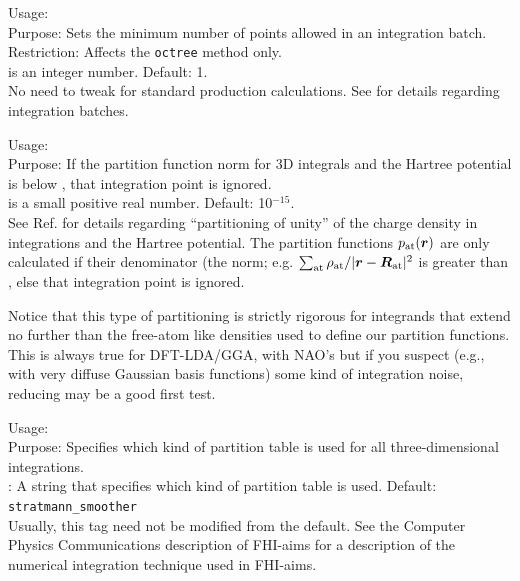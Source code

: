 {
  \noindent
  Usage:   \\[1.0ex]
  Purpose: Sets the minimum number of points allowed in an integration
  batch. \\[1.0ex]
  Restriction: Affects the \texttt{octree}
   method only. \\[1.0ex] 
   is an integer number. Default: 1. \\
}
No need to tweak for standard production calculations. See
 for details regarding integration
batches. 

{
  \noindent
  Usage:   \\[1.0ex]
  Purpose: If the partition function norm for 3D integrals and the
  Hartree potential is below , that integration
  point is ignored. \\[1.0ex]
   is a small positive real number. Default:
    10$^{-15}$. \\
}
See Ref. \cite{Blum08} for details regarding ``partitioning of unity''
of the charge density in integrations and the Hartree potential. 
The partition functions $p_\text{at}(\mbox{\boldmath$r$})$ are only
calculated if their denominator (the norm; e.g. $\sum_\text{at}
\rho_\text{at}/|\mbox{\boldmath$r$}-\mbox{\boldmath$R$}_\text{at}|^2$ is greater than ,
else that integration point is ignored.

Notice that this type of partitioning is strictly
rigorous for integrands that extend no further than the free-atom like
densities used to define our partition functions. This is always true
for DFT-LDA/GGA, with NAO's but if you suspect (e.g., with very diffuse
Gaussian basis functions) some kind of integration noise, reducing
 may be a good first test. 

{
  \noindent
  Usage:     \\[1.0ex]
  Purpose: Specifies which kind of partition table is used for all
    three-dimensional integrations. \\[1.0ex] 
   : A string that specifies which kind of partition
    table is used. Default: \texttt{stratmann\_smoother} \\ 
}
Usually, this tag need not be modified from the default. See the
Computer Physics Communications description of FHI-aims for a 
description of the numerical integration technique used in FHI-aims. 


